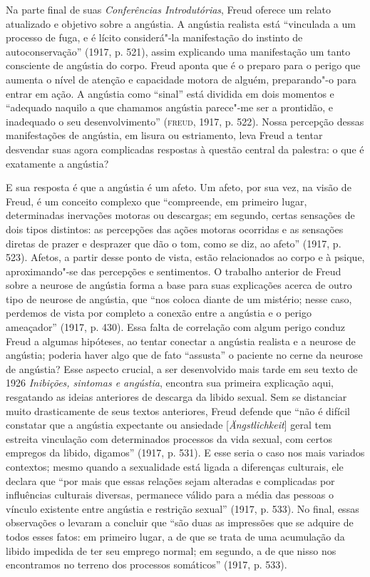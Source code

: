 Na parte final de suas \emph{Conferências Introdutórias}, Freud
oferece um relato atualizado e objetivo sobre a angústia. A angústia
realista está ``vinculada a um processo de fuga, e é lícito considerá"-la
manifestação do instinto de autoconservação'' (1917, p. 521),
assim explicando uma manifestação um tanto consciente de angústia do
corpo. Freud aponta que é o preparo para o perigo que aumenta o nível de
atenção e capacidade motora de alguém, preparando"-o para entrar em ação.
A angústia como ``sinal'' está dividida em dois momentos e ``adequado
naquilo a que chamamos angústia parece"-me ser a prontidão, e inadequado
o seu desenvolvimento'' (\textsc{freud}, 1917, p. 522). Nossa percepção dessas
manifestações de angústia, em lisura ou estriamento, leva Freud a tentar
desvendar suas agora complicadas respostas à questão central da
palestra: o que é exatamente a angústia?

E sua resposta é que a angústia é um afeto. Um afeto, por sua vez, na
visão de Freud, é um conceito complexo que ``compreende, em
primeiro lugar, determinadas inervações motoras ou descargas; em
segundo, certas sensações de dois tipos distintos: as percepções das
ações motoras ocorridas e as sensações diretas de prazer e desprazer que
dão o tom, como se diz, ao afeto'' (1917, p. 523). Afetos, a
partir desse ponto de vista, estão relacionados ao corpo e à psique,
aproximando"-se das percepções e sentimentos. O trabalho anterior de
Freud sobre a neurose de angústia forma a base para suas explicações
acerca de outro tipo de neurose de angústia, que ``nos coloca diante de
um mistério; nesse caso, perdemos de vista por completo a conexão entre
a angústia e o perigo ameaçador'' (1917, p. 430). Essa falta de
correlação com algum perigo conduz Freud a algumas hipóteses, ao tentar
conectar a angústia realista e a neurose de angústia; poderia haver algo
que de fato ``assusta'' o paciente no cerne da neurose de angústia? Esse
aspecto crucial, a ser desenvolvido mais tarde em seu texto de 1926
\emph{Inibições, sintomas e angústia}, encontra sua primeira explicação
aqui, resgatando as ideias anteriores de descarga da libido sexual. Sem
se distanciar muito drasticamente de seus textos anteriores, Freud
defende que ``não é difícil constatar que a angústia expectante ou
ansiedade {[}\emph{Ängstlichkeit}{]} geral tem estreita vinculação com
determinados processos da vida sexual, com certos empregos da libido,
digamos'' (1917, p. 531). E esse seria o caso nos mais variados
contextos; mesmo quando a sexualidade está ligada a diferenças
culturais, ele declara que ``por mais que essas relações sejam alteradas
e complicadas por influências culturais diversas, permanece válido para
a média das pessoas o vínculo existente entre angústia e restrição
sexual'' (1917, p. 533). No final, essas observações o levaram a
concluir que ``são duas as impressões que se adquire de todos esses
fatos: em primeiro lugar, a de que se trata de uma acumulação da libido
impedida de ter seu emprego normal; em segundo, a de que nisso nos
encontramos no terreno dos processos somáticos'' (1917, p. 533).

